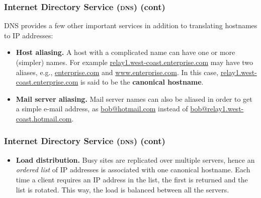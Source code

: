 %
\begin{frame}
\frametitle{Internet Directory Service (\textsc{dns}) (cont)}

DNS provides a few other important services in addition to translating
hostnames to IP addresses:

\begin{itemize}

  \item \textbf{Host aliasing.} A host with a complicated name can
    have one or more (simpler) names. For example
    \url{relay1.west-coast.enterprise.com} may have two alia\-ses,
    e.g., \url{enterprise.com} and \url{www.enterprise.com}. In this
    case, \url{relay1.west-coast.enterprise.com} is said to be the
    \textbf{canonical hostname}.

  \item \textbf{Mail server aliasing.} Mail server names can also be
  aliased in order to get a simple e-mail address, as
  \url{bob@hotmail.com} instead of
  \url{bob@relay1.west-coast.hotmail.com}.

\end{itemize}

\end{frame}

%
\begin{frame}
\frametitle{Internet Directory Service (\textsc{dns}) (cont)}

\begin{itemize}

  \item \textbf{Load distribution.} Busy sites are replicated over
  multiple servers, hence an \emph{ordered list} of IP addresses is
  associated with one canonical hostname. Each time a client requires
  an IP address in the list, the first is returned and the list is
  rotated. This way, the load is balanced between all the servers.

\end{itemize}

\end{frame}


